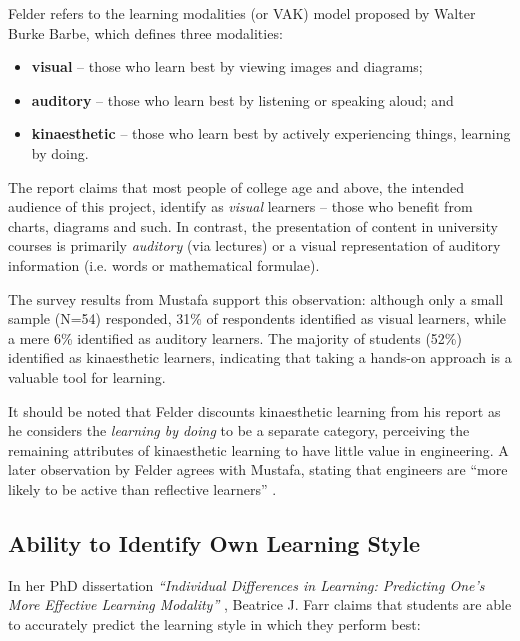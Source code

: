 \documentclass[bsc,twoside,singlespacing,parskip,logo,notimes,normalheadings]{infthesis}
\begin{document}
    Felder refers to the learning modalities (or VAK) model proposed
    by Walter Burke Barbe, which defines three modalities:

    \begin{itemize}
    \item {\bf visual} -- those who learn best by viewing images and
      diagrams;
    \item {\bf auditory} -- those who learn best by listening or
      speaking aloud; and
    \item {\bf kinaesthetic} -- those who learn best by actively
      experiencing things, learning by doing.
    \end{itemize}

    The report claims that most people of college age and above, the
    intended audience of this project, identify as {\em visual}
    learners -- those who benefit from charts, diagrams and such. In
    contrast, the presentation of content in university courses is
    primarily {\em auditory} (via lectures) or a visual representation
    of auditory information (i.e. words or mathematical formulae).

    The survey results from Mustafa\cite[p. 103]{mustafa2010} support this
    observation: although only a small sample (N=54) responded, 31\%
    of respondents identified as visual learners, while a mere 6\%
    identified as auditory learners. The majority of students (52\%)
    identified as kinaesthetic learners, indicating that taking a
    hands-on approach is a valuable tool for learning.

    It should be noted that Felder discounts kinaesthetic learning
    from his report as he considers the {\em learning by doing} to be
    a separate category, perceiving the remaining attributes of
    kinaesthetic learning to have little value in engineering. A later
    observation by Felder agrees with Mustafa, stating that engineers
    are ``more likely to be active than reflective learners''
    \cite[p. 678]{felder1988}.

        \subsection{Ability to Identify Own Learning Style}

        In her PhD dissertation {\em ``Individual Differences in
          Learning: Predicting One's More Effective Learning
          Modality''} \cite{farr1970}, Beatrice J. Farr claims that
        students are able to accurately predict the learning style in
        which they perform best:
\end{document}
